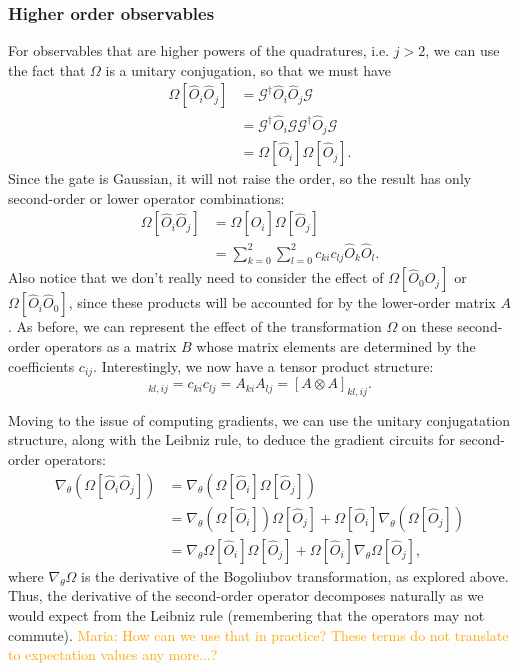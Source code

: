 \documentclass[aps,pra,10pt,twocolumn,groupedaddress,nofootinbib]{revtex4-1}
\theoremstyle{plain}
\newcommand{\maria}[1]{\textcolor{orange}{Maria: #1}}
\begin{document}
\subsubsection{Higher order observables}

For observables that are higher powers of the quadratures, i.e. $j > 2$, we can use the fact that $\Omega$ is a unitary conjugation, so that we must have
\begin{align}
 \Omega[\hat{O}_i\hat{O}_j] 
 & = \mathcal{G}^\dagger \hat{O}_i \hat{O}_j \mathcal{G} \nonumber \\
 & = \mathcal{G}^\dagger \hat{O}_i \mathcal{G} \mathcal{G}^\dagger\hat{O}_j \mathcal{G} \nonumber\\
 & = \Omega[\hat{O}_i] \Omega[\hat{O}_j].
\end{align}
Since the gate is Gaussian, it will not raise the order, so the result has only second-order or lower operator combinations:
\begin{align}
 \Omega[\hat{O}_i\hat{O}_j] 
 & = \Omega[\hat{O}_i] \Omega[\hat{O}_j] \nonumber \\
 & = \sum_{k=0}^2 \sum_{l=0}^2 c_{ki}c_{lj} \hat{O}_k \hat{O}_l.
\end{align}
Also notice that we don't really need to consider the effect of $\Omega[\hat{O}_0\hat{O}_j]$ or $\Omega[\hat{O}_i\hat{O}_0]$, since these products will be accounted for by the lower-order matrix $A$.
As before, we can represent the effect of the transformation $\Omega$ on these second-order operators as a matrix $B$ whose matrix elements are determined by the coefficients $c_{ij}$. Interestingly, we now have a tensor product structure:
\begin{equation}
 [B]_{kl,ij} = c_{ki} c_{lj} = A_{ki}A_{lj} = [A\otimes A]_{kl,ij}.
\end{equation}

Moving to the issue of computing gradients, we can use the unitary conjugatation structure, along with the Leibniz rule, to deduce the gradient circuits for second-order operators:
\begin{align}
 \nabla_\theta\left(\Omega[\hat{O}_i\hat{O}_j] \right)
 & = \nabla_\theta\left(\Omega[\hat{O}_i] \Omega[\hat{O}_j]\right) \nonumber \\
 & = \nabla_\theta\left( \Omega[\hat{O}_i] \right)\Omega[\hat{O}_j] 
 + \Omega[\hat{O}_i]\nabla_\theta \left( \Omega[\hat{O}_j] \right) \nonumber \\
 & = \nabla_\theta\Omega [\hat{O}_i] \Omega[\hat{O}_j] 
 + \Omega[\hat{O}_i]\nabla_\theta \Omega[\hat{O}_j],
\end{align}
where $\nabla_\theta\Omega$ is the derivative of the Bogoliubov transformation, as explored above.
Thus, the derivative of the second-order operator decomposes naturally as we would expect from the Leibniz rule (remembering that the operators may not commute). \maria{How can we use that in practice? These terms do not translate to expectation values any more...?}
\end{document}

